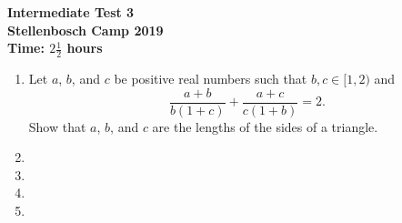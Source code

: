 \documentclass{article}
\begin{document}
\thispagestyle{empty}

\begin{center}
  \textbf{\Large Intermediate Test 3}
  \\ \vspace{1em}
  \textbf{\large Stellenbosch Camp 2019}
  \\ \vspace{1em}
  \textbf{\large Time: $2\frac{1}{2}$ hours}
\end{center}

\vfill

\begin{enumerate}[1.]

\item %
Let $a$, $b$, and $c$ be positive real numbers such that $b, c \in [1,2)$ and
\[ \frac{a+b}{b(1+c)} +\frac{a+c}{c(1+b)} = 2. \]
Show that $a$, $b$, and $c$ are the lengths of the sides of a triangle.


\item %


\item %


\item %


\item %

\end{enumerate}


\vfill
\begin{center}
  \begin{BVerbatim}
  \end{BVerbatim}
\end{center}
\end{document}
